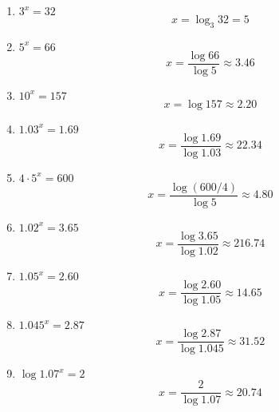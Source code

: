 \documentclass{article}
\begin{document}
\begin{enumerate}
    \item $3^x=32$
    \[x = \log_3 32 = 5\]

    \item $5^x=66$
    \[x = \frac{\log 66}{\log 5} \approx 3.46\]

    \item $10^x=157$
    \[x = \log 157 \approx 2.20\]

    \item $1.03^x=1.69$
    \[x = \frac{\log 1.69}{\log 1.03} \approx 22.34\]

    \item $4 \cdot 5^x=600$
    \[x = \frac{\log (600/4)}{\log 5} \approx 4.80\]

    \item $1.02^x=3.65$
    \[x = \frac{\log 3.65}{\log 1.02} \approx 216.74\]

    \item $1.05^x=2.60$
    \[x = \frac{\log 2.60}{\log 1.05} \approx 14.65\]

    \item $1.045^x=2.87$
    \[x = \frac{\log 2.87}{\log 1.045} \approx 31.52\]

    \item $\log 1.07^x=2$
    \[x = \frac{2}{\log 1.07} \approx 20.74\]
\end{enumerate}
\end{document}
